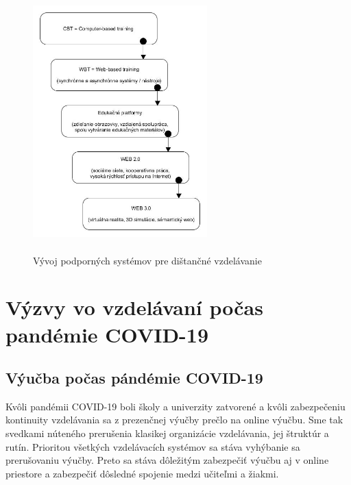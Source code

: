 \documentclass[10pt,oneside,slovak,a4paper]{article}
\begin{document}
\begin{figure}[]
	\centering
	\includegraphics[scale=0.15, height=100mm,width=0.6\textwidth]{Dev_Of_SupSys_DE.jpg}
	\caption{Vývoj podporných systémov pre dištančné vzdelávanie\cite{WiktorzakKotowski}}
	\label{Vyvoj_podp_sys_DE}
\end{figure}

\section{Výzvy vo vzdelávaní počas pandémie COVID-19}
\subsection{Výučba počas pándémie COVID-19} %
Kvôli pandémii COVID-19 boli školy a univerzity zatvorené a kvôli zabezpečeniu kontinuity vzdelávania sa z prezenčnej výučby prečlo na online výučbu.\cite{covid19}
Sme tak svedkami núteného prerušenia klasikej organizácie vzdelávania, jej štruktúr a rutín.
Prioritou všetkých vzdelávacích systémov sa stáva vyhýbanie sa prerušovaniu výučby. Preto sa stáva dôležitým zabezpečiť 
výučbu aj v online priestore a zabezpečiť dôsledné spojenie medzi učiteľmi a žiakmi.
\end{document}

